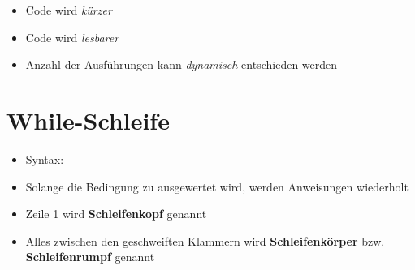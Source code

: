 \begin{frame}
    \slidehead

    \begin{itemize}
        \item Code wird \textit{kürzer}
        \item Code wird \textit{lesbarer}
        \item Anzahl der Ausführungen kann \textit{dynamisch} entschieden werden
    \end{itemize}
\end{frame}


\section{While-Schleife}
\subtitle{Kapitel 4: Befehle wiederholen}



\begin{frame}
    \slidehead

    \begin{itemize}
        \item Syntax:
        \item Solange die Bedingung zu  ausgewertet wird, werden Anweisungen wiederholt
        \item Zeile 1 wird \textbf{Schleifenkopf} genannt
        \item Alles zwischen den geschweiften Klammern wird \textbf{Schleifenkörper} bzw. \textbf{Schleifenrumpf} genannt
    \end{itemize}
\end{frame}

